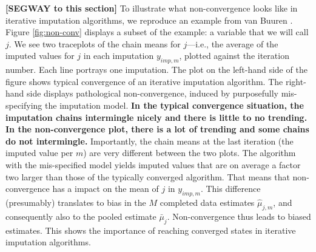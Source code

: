 \documentclass[Royal,times,sageh]{sagej}
\begin{document}
\textbf{{[}SEGWAY to this section{]}} To illustrate what non-convergence looks like in iterative imputation algorithms, we reproduce an example from van Buuren \citeyearpar[\(\S\) 6.5.2]{buur18}. Figure \ref{fig:non-conv} displays a subset of the example: a variable that we will call \(j\). We see two traceplots of the chain means for \(j\)---i.e., the average of the imputed values for \(j\) in each imputation \(y_{imp,m}\), plotted against the iteration number. Each line portrays one imputation. The plot on the left-hand side of the figure shows typical convergence of an iterative imputation algorithm. The right-hand side displays pathological non-convergence, induced by purposefully mis-specifying the imputation model. \textbf{In the typical convergence situation, the imputation chains intermingle nicely and there is little to no trending. In the non-convergence plot, there is a lot of trending and some chains do not intermingle.} Importantly, the chain means at the last iteration (the imputed value per \(m\)) are very different between the two plots. The algorithm with the mis-specified model yields imputed values that are on average a factor two larger than those of the typically converged algorithm. That means that non-convergence has a impact on the mean of \(j\) in \(y_{imp, m}\). This difference (presumably) translates to bias in the \(M\) completed data estimates \(\hat{\mu}_{j,m}\), and consequently also to the pooled estimate \(\bar{\mu}_j\). Non-convergence thus leads to biased estimates. This shows the importance of reaching converged states in iterative imputation algorithms.
\end{document}
